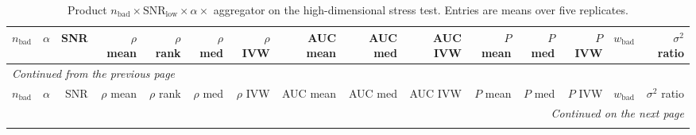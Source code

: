 \begin{landscape}
\footnotesize
\setlength{\tabcolsep}{3.5pt}
\begin{longtable}{rrrrrrrrrrrrrrr}
\caption{Product $n_{\mathrm{bad}}\times\mathrm{SNR}_{\mathrm{low}}\times\alpha\times$ aggregator on the high-dimensional stress test. Entries are means over five replicates.}
\label{tab:Product_HighDimResults}\\
\toprule
$n_{\mathrm{bad}}$ & $\alpha$ & SNR & $\rho$ mean & $\rho$ rank & $\rho$ med & $\rho$ IVW & AUC mean & AUC med & AUC IVW & $P$ mean & $P$ med & $P$ IVW & $w_{\mathrm{bad}}$ & $\sigma^2$ ratio \\
\midrule
\endfirsthead
\multicolumn{15}{l}{\emph{Continued from the previous page}}\\
\toprule
$n_{\mathrm{bad}}$ & $\alpha$ & SNR & $\rho$ mean & $\rho$ rank & $\rho$ med & $\rho$ IVW & AUC mean & AUC med & AUC IVW & $P$ mean & $P$ med & $P$ IVW & $w_{\mathrm{bad}}$ & $\sigma^2$ ratio \\
\midrule
\endhead
\midrule
\multicolumn{15}{r}{\emph{Continued on the next page}}\\
\endfoot
\bottomrule
\endlastfoot


\end{longtable}
\end{landscape}
